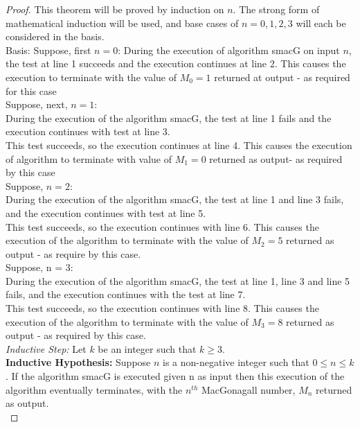 \documentclass[12pt]{article}
\begin{document}
\begin{proof}
    \noindent This theorem will be proved by induction on $n$. The strong form of mathematical induction will be used, and base cases of $n = 0, 1, 2 ,3$ will each be considered in the basis.\\
    
    \noindent Basis: Suppose, first $n = 0$: \newline During the execution of algorithm smacG on input $n$, the test at line 1 succeeds and the execution continues at line 2. This causes the execution to terminate with the value of $M_0 = 1$ returned at output - as required for this case \\ 
    
    \noindent Suppose, next, $n = 1$: \\ During the execution of the algorithm smacG, the test at line 1 fails and the execution continues with test at line 3. \\ This test succeeds, so the execution continues at line 4. This causes the execution of algorithm to terminate with value of $M_1 = 0$ returned as output- as required by this case \\ 
    
    \noindent Suppose, $n = 2$: \\ During the execution of the algorithm smacG, the test at line 1 and line 3 fails, and the execution continues with test at line 5. \\ This test succeeds, so the execution continues with line 6. This causes the execution of the algorithm to terminate with the value of $M_2 = 5$ returned as output - as require by this case. \\ 
    
    \noindent Suppose, n = 3: \\ During the execution of the algorithm smacG, the test at line 1, line 3 and line 5 fails, and the execution continues with the test at line 7. \\ This test succeeds, so the execution continues with line 8. This causes the execution of the algorithm to terminate with the value of $M_3 = 8$ returned as output - as required by this case. \\ 
    
    \noindent \textit{Inductive Step: } Let $k$ be an integer such that $k \geq 3$. \\
    
    \noindent \textbf{Inductive Hypothesis: } Suppose $n$ is a non-negative integer such that $ 0 \leq n \leq k$. If the algorithm smacG is executed given n as input then this execution of the algorithm eventually terminates, with the $n^{th}$ MacGonagall number, $M_n$ returned as output. \\
    

\end{proof}
\end{document}
